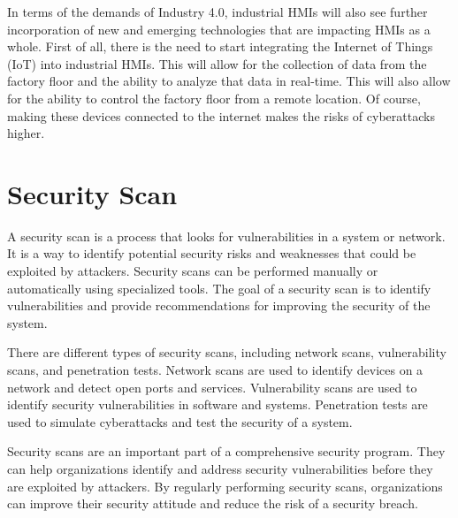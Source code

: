 In terms of the demands of Industry 4.0, industrial HMIs will also see further incorporation of new and emerging technologies that are impacting HMIs as a whole. First of all, there is the need to start integrating the Internet of Things (IoT) into industrial HMIs. This will allow for the collection of data from the factory floor and the ability to analyze that data in real-time. This will also allow for the ability to control the factory floor from a remote location. Of course, making these devices connected to the internet makes the risks of cyberattacks higher.

\section{Security Scan}

A security scan is a process that looks for vulnerabilities in a system or network. It is a way to identify potential security risks and weaknesses that could be exploited by attackers. Security scans can be performed manually or automatically using specialized tools. The goal of a security scan is to identify vulnerabilities and provide recommendations for improving the security of the system.

There are different types of security scans, including network scans, vulnerability scans, and penetration tests. Network scans are used to identify devices on a network and detect open ports and services. Vulnerability scans are used to identify security vulnerabilities in software and systems. Penetration tests are used to simulate cyberattacks and test the security of a system.

Security scans are an important part of a comprehensive security program. They can help organizations identify and address security vulnerabilities before they are exploited by attackers. By regularly performing security scans, organizations can improve their security attitude and reduce the risk of a security breach.



